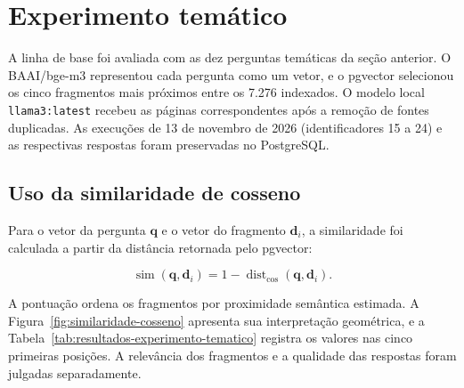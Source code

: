 \section{Experimento temático}

A linha de base foi avaliada com as dez perguntas temáticas da seção anterior. O BAAI/bge-m3 representou cada pergunta como um vetor, e o pgvector selecionou os cinco fragmentos mais próximos entre os 7.276 indexados. O modelo local \texttt{llama3:latest} recebeu as páginas correspondentes após a remoção de fontes duplicadas. As execuções de 13 de novembro de 2026 (identificadores 15 a 24) e as respectivas respostas foram preservadas no PostgreSQL.

\subsection{Uso da similaridade de cosseno}

Para o vetor da pergunta $\mathbf{q}$ e o vetor do fragmento $\mathbf{d}_{i}$, a similaridade foi calculada a partir da distância retornada pelo pgvector:

\begin{equation}
\operatorname{sim}(\mathbf{q},\mathbf{d}_{i}) = 1 - \operatorname{dist}_{\cos}(\mathbf{q},\mathbf{d}_{i}).
\end{equation}

A pontuação ordena os fragmentos por proximidade semântica estimada. A Figura~\ref{fig:similaridade-cosseno} apresenta sua interpretação geométrica, e a Tabela~\ref{tab:resultados-experimento-tematico} registra os valores nas cinco primeiras posições. A relevância dos fragmentos e a qualidade das respostas foram julgadas separadamente.

